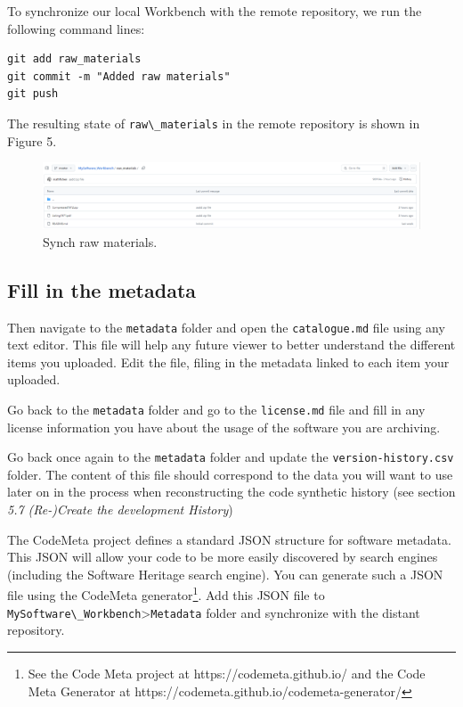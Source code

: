 \documentclass[]{article}
\newcommand{\passthrough}[1]{#1}
\begin{document}
To synchronize our local Workbench with the remote repository, we run
the following command lines:

\begin{lstlisting}
git add raw_materials
git commit -m "Added raw materials"
git push
\end{lstlisting}

The resulting state of \passthrough{\lstinline!raw\_materials!} in the
remote repository is shown in Figure 5.

\begin{figure}
\hypertarget{fig:RawMaterials_local}{%
\centering
\includegraphics{./media2/13_AddRawMaterials.png}
\caption{Synch raw materials.}\label{fig:RawMaterials_local}
}
\end{figure}

\hypertarget{fill-in-the-metadata}{%
\subsection{Fill in the metadata}\label{fill-in-the-metadata}}

Then navigate to the \passthrough{\lstinline!metadata!} folder and open
the \passthrough{\lstinline!catalogue.md!} file using any text editor.
This file will help any future viewer to better understand the different
items you uploaded. Edit the file, filing in the metadata linked to each
item your uploaded.

Go back to the \passthrough{\lstinline!metadata!} folder and go to the
\passthrough{\lstinline!license.md!} file and fill in any license
information you have about the usage of the software you are archiving.

Go back once again to the \passthrough{\lstinline!metadata!} folder and
update the \passthrough{\lstinline!version-history.csv!} folder. The
content of this file should correspond to the data you will want to use
later on in the process when reconstructing the code synthetic history
(see section \emph{5.7 (Re-)Create the development History})

The CodeMeta project defines a standard JSON structure for software
metadata. This JSON will allow your code to be more easily discovered by
search engines (including the Software Heritage search engine). You can
generate such a JSON file using the CodeMeta generator\footnote{See the
  Code Meta project at https://codemeta.github.io/ and the Code Meta
  Generator at https://codemeta.github.io/codemeta-generator/}. Add this
JSON file to
\passthrough{\lstinline!MySoftware\_Workbench!}\textgreater{}\passthrough{\lstinline!Metadata!}
folder and synchronize with the distant repository.
\end{document}
